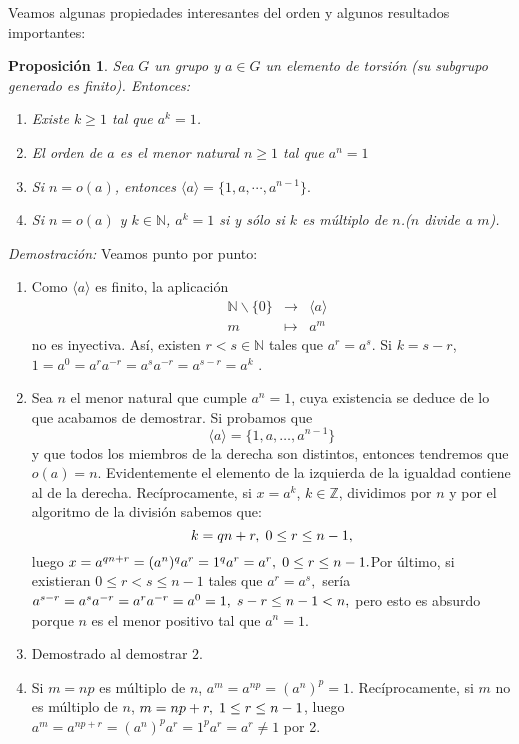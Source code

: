 \documentclass[12pt]{article}
\newtheorem{proposition}[theorem]{Proposición}
\begin{document}
Veamos algunas propiedades interesantes del orden y algunos resultados importantes: 
\begin{proposition}Sea $G$ un grupo y $a \in G$ un elemento de torsión (su subgrupo generado es finito). Entonces:
\renewcommand{\labelenumi}{\arabic{enumi}.}
\begin{enumerate}
\item Existe $k \geq 1$ tal que $a^{k}=1$.
\item El orden de $a$ es el menor natural $n \geq 1$ tal que $a^{n} = 1$
\item Si $n = o(a)$, entonces $\langle a \rangle = \lbrace 1, a, \cdots, a^{n-1} \rbrace.$
\item Si $n = o(a)$ y $k \in \mathbb{N}$, $a^{k} = 1$ si y sólo si $k$ es múltiplo de $n$.($n$ divide a $m$).
\end{enumerate}
\end{proposition}
\emph{Demostración: } Veamos punto por punto: \begin{enumerate}
\item Como $\langle a \rangle$ es finito, la aplicación 
$$
\begin{array}{rccl}
&\mathbb{N} \backslash \lbrace 0 \rbrace & \longrightarrow &\langle a \rangle\\
&m& \longmapsto &a^{m}
\end{array}
$$ no es inyectiva. Así, existen $r<s \in \mathbb{N}$ tales que $a^{r} = a^{s}.$ Si $k = s - r$, $1 = a^{0} = a^{r}a^{-r} = a^{s}a^{-r} = a^{s-r} = a^{k}$ .
\item Sea $n$ el menor natural que cumple $a^{n} = 1$, cuya existencia se deduce de lo que acabamos de demostrar. Si probamos que $$\langle a \rangle = \lbrace 1, a, \ldots, a^{n-1} \rbrace$$ y que todos los miembros de la derecha son distintos, entonces tendremos que $o(a) = n$.
Evidentemente el elemento de la izquierda de la igualdad contiene al de la derecha. Recíprocamente, si $x = a^{k}$, $k \in \mathbb{Z}$, dividimos por $n$ y por el algoritmo de la división sabemos que: $$k = qn + r, \hspace{0.1cm} 0\leq r \leq n-1,$$ luego $x = a^{qn+r}= (a^{n})^{q}a^{r} = 1^{q}a^{r} = a^{r}, \hspace{0.1cm}  0\leq r \leq n-1.$Por último, si existieran $0\leq r < s \leq n-1$ tales que $a^{r} = a^{s},$ sería $a^{s-r} = a^{s}a^{-r} = a^{r}a^{-r} = a^{0} = 1, \hspace{0.1cm} s-r \leq n-1 < n,$ pero esto es absurdo porque $n$ es el menor positivo tal que $a^{n} = 1$.
\item Demostrado al demostrar $2.$
\item Si $m = np$ es múltiplo de $n$, $a^{m} = a^{np} = (a^{n})^{p} = 1.$ Recíprocamente, si $m$ no es múltiplo de $n$, $m = np + r, \hspace{0.1cm} 1\leq r\leq n-1$, luego $a^{m} = a^{np + r} = (a^{n})^{p}a^{r} = 1^{p}a^{r} = a^{r} \neq 1$ por 2.
\end{enumerate}
\end{document}
